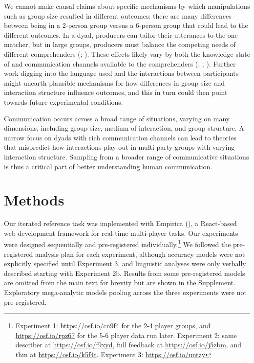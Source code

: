 \documentclass[
  english,
]{article}
\begin{document}
We cannot make causal claims about specific mechanisms by which manipulations such as group size resulted in different outcomes: there are many differences between being in a 2-person group versus a 6-person group that could lead to the different outcomes. In a dyad, producers can tailor their utterances to the one matcher, but in large groups, producers must balance the competing needs of different comprehenders (; ). These effects likely vary by both the knowledge state of and communication channels available to the comprehenders (; ; ). Further work digging into the language used and the interactions between participants might unearth plausible mechanisms for how differences in group size and interaction structure influence outcomes, and this in turn could then point towards future experimental conditions.

Communication occurs across a broad range of situations, varying on many dimensions, including group size, medium of interaction, and group structure.
A narrow focus on dyads with rich communication channels can lead to theories that mispredict how interactions play out in multi-party groups with varying interaction structure.
Sampling from a broader range of communicative situations is thus a critical part of better understanding human communication.

\section{Methods}\label{methods}

Our iterated reference task was implemented with Empirica (), a React-based web development framework for real-time multi-player tasks.
Our experiments were designed sequentially and pre-registered individually.\footnote{Experiment 1: \url{https://osf.io/cn9f4} for the 2-4 player groups, and \url{https://osf.io/rpz67} for the 5-6 player data run later. Experiment 2: same describer at \url{https://osf.io/f9xyd}, full feedback at \url{https://osf.io/j5zbm}, and thin at \url{https://osf.io/k5f4t}. Experiment 3: \url{https://osf.io/untzy}}
We followed the pre-registered analysis plan for each experiment, although accuracy models were not explicitly specified until Experiment 3, and linguistic analyses were only verbally described starting with Experiment 2b.
Results from some pre-registered models are omitted from the main text for brevity but are shown in the Supplement.
Exploratory mega-analytic models pooling across the three experiments were not pre-registered.
\end{document}
